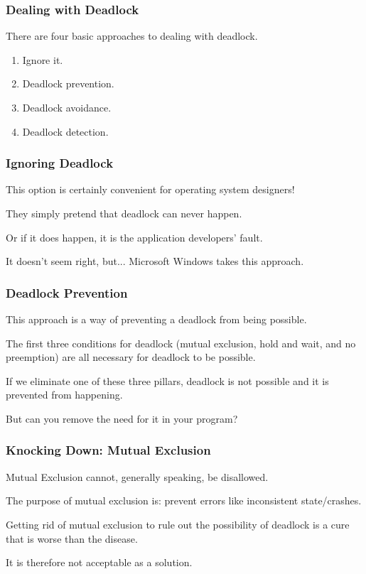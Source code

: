 \begin{frame}
\frametitle{Dealing with Deadlock}

There are four basic approaches to dealing with deadlock.

\begin{enumerate}
	\item Ignore it.
	\item Deadlock prevention.
	\item Deadlock avoidance.
	\item Deadlock detection.
\end{enumerate}

\end{frame}

\begin{frame}
\frametitle{Ignoring Deadlock}

This option is certainly convenient for operating system designers!

They simply pretend that deadlock can never happen. 

Or if it does happen, it is the application developers' fault. 

It doesn't seem right, but... Microsoft Windows takes this approach.

\end{frame}

\begin{frame}
\frametitle{Deadlock Prevention}

This approach is a way of preventing a deadlock from being possible. 

The first three conditions for deadlock (mutual exclusion, hold and wait, and no preemption) are all necessary for deadlock to be possible. 

If we eliminate one of these three pillars, deadlock is not possible and it is prevented from happening.

But can you remove the need for it in your program?

\end{frame}

\begin{frame}
\frametitle{Knocking Down: Mutual Exclusion}

Mutual Exclusion cannot, generally speaking, be disallowed. 

The purpose of  mutual exclusion is: prevent errors like inconsistent state/crashes. 

Getting rid of mutual exclusion to rule out the possibility of deadlock is a cure that is worse than the disease.

It is therefore not acceptable as a solution.


\end{frame}

